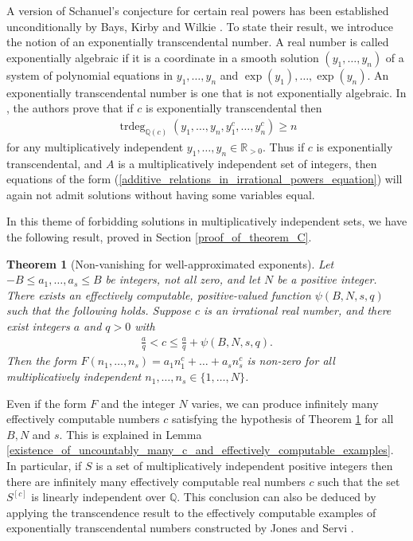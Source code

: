 \documentclass[9pt]{amsart}
\theoremstyle{my_theorem_style}
\numberwithin{definition}{section}
\newtheorem{theorem}[definition]{Theorem}
\newcommand{\Q}{\mathbb{Q}}
\newcommand{\R}{\mathbb{R}}
\DeclareMathOperator{\trdeg}{trdeg}
\begin{document}
A version of Schanuel's conjecture for certain real powers has been established unconditionally by Bays, Kirby and Wilkie \cite[Theorem 1.1]{Bays--Kirby--Wilkie_A_Schanuel_property_for_exponentially_transcendental_powers}. To state their result, we introduce the notion of an exponentially transcendental number. A real number is called exponentially algebraic if it is a coordinate in a smooth solution $(y_1, \dots, y_n)$ of a system of polynomial equations in $y_1, \dots, y_n$ and $\exp(y_1), \dots, \exp(y_n)$. An exponentially transcendental number is one that is not exponentially algebraic. In \cite{Bays--Kirby--Wilkie_A_Schanuel_property_for_exponentially_transcendental_powers}, the authors prove that if $c$ is exponentially transcendental then
\begin{align*}
    \trdeg_{\Q(c)}(y_1, \dots, y_n, y_1^c, \dots, y_n^c) \geq n
\end{align*}
for any multiplicatively independent $y_1, \dots, y_n \in \R_{>0}$. Thus if $c$ is exponentially transcendental, and $A$ is a multiplicatively independent set of integers, then equations of the form (\ref{additive_relations_in_irrational_powers_equation}) will again not admit solutions without having some variables equal.

In this theme of forbidding solutions in multiplicatively independent sets, we have the following result, proved in Section \ref{proof_of_theorem_C}.

\begin{theorem}
[Non-vanishing for well-approximated exponents]
\label{lower_bound_on_linear_form_in_irrational_powers}
    Let $-B \leq a_1, \dots, a_s \leq B$ be integers, not all zero, and let $N$ be a positive integer. There exists an effectively computable, positive-valued function $\psi(B, N, s, q)$ such that the following holds. Suppose $c$ is an irrational real number, and there exist integers $a$ and $q > 0$ with
    \begin{align}
    \label{Diophantine_approximation_condition}
        \frac{a}{q} < c \leq \frac{a}{q} + \psi(B, N, s, q).
    \end{align}
    Then the form $F(n_1, \dots, n_s) = a_1 n_1^c + \dots + a_s n_s^c$ is non-zero for all multiplicatively independent $n_1, \dots, n_s \in \{1, \dots, N\}$.
\end{theorem}

Even if the form $F$ and the integer $N$ varies, we can produce infinitely many effectively computable numbers $c$ satisfying the hypothesis of Theorem \ref{lower_bound_on_linear_form_in_irrational_powers} for all $B, N$ and $s$. This is explained in Lemma \ref{existence_of_uncountably_many_c_and_effectively_computable_examples}. In particular, if $S$ is a set of multiplicatively independent positive integers then there are infinitely many effectively computable real numbers $c$ such that the set $S^{[c]}$ is linearly independent over $\Q$. This conclusion can also be deduced by applying the transcendence result \cite[Theorem 1.1]{Bays--Kirby--Wilkie_A_Schanuel_property_for_exponentially_transcendental_powers} to the effectively computable examples of exponentially transcendental numbers constructed by Jones and Servi \cite[Section 4]{Jones--Servi_on_the_decidability_of_the_real_field_with_a_generic_power_function}.
\end{document}
